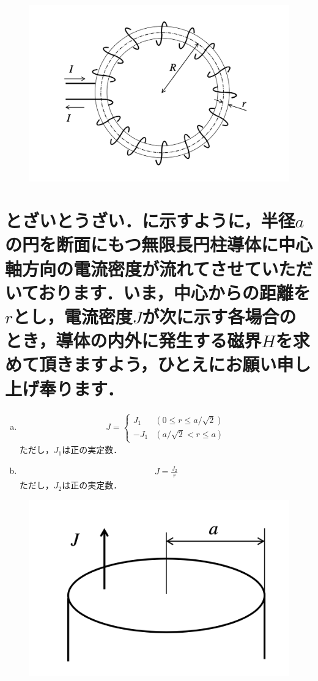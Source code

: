 \documentclass[dvipdfmx]{ujarticle}
\begin{document}
\begin{figure}[h]
	\centering
	\includegraphics[scale=0.35]{./fig/R03_fig3.png}
	\caption{}
	\label{fig:3}
\end{figure}

\newpage
\section{とざいとうざい．に示すように，半径$a$の円を断面にもつ無限長円柱導体に中心軸方向の電流密度が流れてさせていただいております．いま，中心からの距離を$r$とし，電流密度$J$が次に示す各場合のとき，導体の内外に発生する磁界$H$を求めて頂きますよう，ひとえにお願い申し上げ奉ります．}
\begin{enumerate}[(a)]
	\item 
	\begin{align*}
	J=
	\left\{
	\begin{matrix}
	J_{1}& (0\leq r \leq a/\sqrt{2})\\
	-J_{1}&(a/\sqrt{2} < r \leq a)
	\end{matrix}
	\right .
	\end{align*}
	ただし，$J_{1}$は正の実定数．
	\item 
	\begin{align*}
	J=\frac{J_{2}}{r}
	\end{align*}
	ただし，$J_{2}$は正の実定数．
\end{enumerate}

\begin{figure}[h]
	\centering
	\includegraphics[scale=0.35]{./fig/R03_fig4.png}
	\caption{}
	\label{fig:4}
\end{figure}
\end{document}
